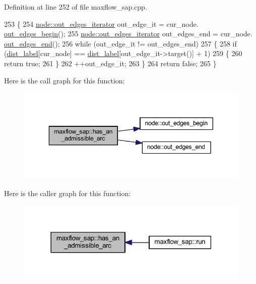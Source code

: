 Definition at line 252 of file maxflow\+\_\+sap.\+cpp.


\begin{DoxyCode}
253 \{
254     \mbox{\hyperlink{classnode_a90e17ed34de55072e8077f4367499a98}{node::out\_edges\_iterator}} out\_edge\_it = cur\_node.
      \mbox{\hyperlink{classnode_a7dcb80df22118cea04f77ca8c952d9c2}{out\_edges\_begin}}();
255     \mbox{\hyperlink{classnode_a90e17ed34de55072e8077f4367499a98}{node::out\_edges\_iterator}} out\_edges\_end = cur\_node.
      \mbox{\hyperlink{classnode_a7ce2ba5195a63d4df6b44299a02a9378}{out\_edges\_end}}();
256     \textcolor{keywordflow}{while} (out\_edge\_it != out\_edges\_end)
257     \{
258         \textcolor{keywordflow}{if} (\mbox{\hyperlink{classmaxflow__sap_a14eef09823ae0ac69348c2b3a60e6ca3}{dist\_label}}[cur\_node] == \mbox{\hyperlink{classmaxflow__sap_a14eef09823ae0ac69348c2b3a60e6ca3}{dist\_label}}[out\_edge\_it->target()] + 1)
259         \{
260             \textcolor{keywordflow}{return} \textcolor{keyword}{true};
261         \}
262         ++out\_edge\_it;
263     \}
264     \textcolor{keywordflow}{return} \textcolor{keyword}{false};
265 \}
\end{DoxyCode}
Here is the call graph for this function\+:\nopagebreak
\begin{figure}[H]
\begin{center}
\leavevmode
\includegraphics[width=343pt]{classmaxflow__sap_a4fdfe2e37832ed2e522b5c972aa1ba5f_cgraph}
\end{center}
\end{figure}
Here is the caller graph for this function\+:\nopagebreak
\begin{figure}[H]
\begin{center}
\leavevmode
\includegraphics[width=318pt]{classmaxflow__sap_a4fdfe2e37832ed2e522b5c972aa1ba5f_icgraph}
\end{center}
\end{figure}
\mbox{\label{classmaxflow__sap_a7cf86463129a569f41883fdad6869fce}} 
